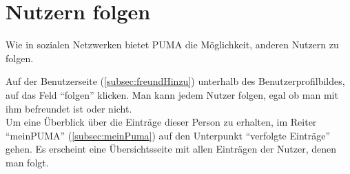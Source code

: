 \section{Nutzern folgen}
\label{sec:nutzernFolgen}
Wie in sozialen Netzwerken bietet PUMA die Möglichkeit, anderen Nutzern zu folgen. 

Auf der Benutzerseite (\autoref{subsec:freundHinzu}) unterhalb des Benutzerprofilbildes, auf das Feld \enquote{folgen} klicken. Man kann jedem Nutzer folgen, egal ob man mit ihm befreundet ist oder nicht. \\
Um eine Überblick über die Einträge dieser Person zu erhalten, im Reiter \enquote{meinPUMA} (\autoref{subsec:meinPuma}) auf den Unterpunkt \enquote{verfolgte Einträge} gehen. Es erscheint eine Übersichtsseite mit allen Einträgen der Nutzer, denen man folgt. 





